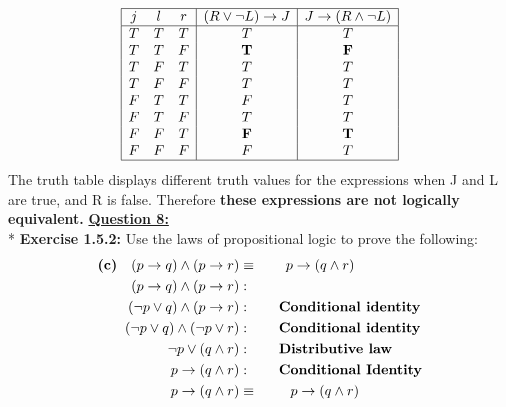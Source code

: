 \documentclass[12pt, letterpaper, twoside]{article}
\begin{document}
\begin{displaymath}
\begin{array}{|c c c|c|c|}
\hline
j & l & r & (R \lor \neg{L}) \to J & J \to(R \land \neg{L}) \\ 
\hline 
T & T & T & T & T\\
T & T & F & \textbf{T} & \textbf{F}\\
T & F & T & T & T\\
T & F & F & T & T\\
F & T & T & F & T\\
F & T & F & T & T\\
F & F & T & \textbf{F} & \textbf{T}\\
F & F & F & F & T\\
\hline
\end{array}
\end{displaymath}
\break
The truth table displays different truth values for the expressions when J and L are true, and R is false. Therefore \textbf{these expressions are not logically equivalent.}
\newpage
\noindent \underline{\textbf{Question 8:}}\\*
\textbf{Exercise 1.5.2:}
Use the laws of propositional logic to prove the following:
\begin{align*}
\text{\textbf{(c)}} \quad (p \to q) \land (p \to r) &\equiv\qquad p \to (q \land r)\\
 (p \to q) \land (p \to r)	&:\\
 (\neg{p} \lor q) \land (p \to r)	&:\qquad	\text{\textbf{Conditional identity}}\\
 (\neg{p} \lor q) \land (\neg{p} \lor r)	&:\qquad	\text{\textbf{Conditional identity}}\\
 \neg{p} \lor (q \land r)		&:\qquad	\text{\textbf{Distributive law}}\\
 p \to (q \land r)		&:\qquad	\text{\textbf{Conditional Identity}}\\
  p \to (q \land r)&\equiv\qquad \  p \to (q \land r)
\end{align*}
\end{document}
